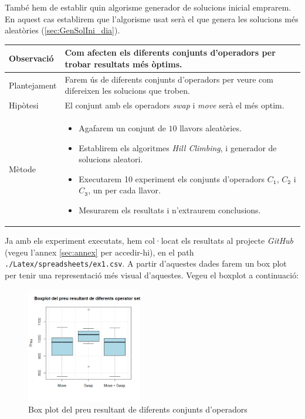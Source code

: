 \documentclass[a4paper]{article}
\begin{document}
	També hem de establir quin algorisme generador de solucions inicial emprarem. En aquest cas establirem que l'algorisme usat serà el que genera les solucions més aleatòries (\ref{sec:GenSolIni_dia}).
	
	\begin{table}[ht]
		\centering
		\begin{tabular}{|l|p{10cm}|}
			\hline
			Observació & Com afecten els diferents conjunts d'operadors per trobar resultats més òptims. \\
			\hline
			Plantejament & Farem ús de diferents conjunts d'operadors per veure com difereixen les solucions que troben. \\
			\hline
			Hipòtesi & El conjunt amb els operadors \textit{swap} i \textit{move} serà el més optim. \\
			\hline
			Mètode & 
			\begin{itemize}
				\item Agafarem un conjunt de $10$ llavors aleatòries.
				\item Establirem els algoritmes \textit{Hill Climbing}, i generador de solucions aleatori.
				\item Executarem 10 experiment els conjunts d'operadors $C_{\texttt{1}}$, $C_{\texttt{2}}$ i $C_{\texttt{3}}$, un per cada llavor.
				\item Mesurarem els resultats i n'extraurem conclusions.
			\end{itemize} \\
			\hline
		\end{tabular}
		\label{tab:exp1_apartats}
	\end{table}
	
	Ja amb els experiment executats, hem col·locat els resultats al projecte \textit{GitHub} (vegeu l'annex \ref{sec:annex} per accedir-hi), en el path \texttt{./Latex/spreadsheets/ex1.csv}. A partir d'aquestes dades farem un box plot per tenir una representació més visual d'aquestes. Vegeu el boxplot a continuació:
	
	\begin{figure}[H]
		\centering
		\includegraphics[width=0.45\textwidth]{images/exp1_boxplot.png}
		\caption{Box plot del preu resultant de diferents conjunts d'operadors}
		\label{fig:exp1_boxplot}
	\end{figure}
	
\end{document}
